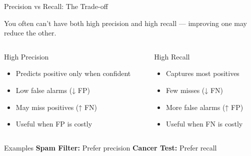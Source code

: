 \documentclass[usenames,dvipsnames]{beamer}
\begin{document}
\begin{frame}{Precision vs Recall: The Trade-off}


You often can't have both high precision and high recall — improving one may reduce the other.


\begin{columns}[t]
\begin{column}{0.48\textwidth}
	\begin{definitionbox}{High Precision}
	\begin{itemize}
		\item Predicts positive only when confident
		\item Low false alarms (↓ FP)
		\item May miss positives (↑ FN)
		\item Useful when FP is costly
	\end{itemize}
	\end{definitionbox}
\end{column}

\begin{column}{0.48\textwidth}
	\begin{definitionbox}{High Recall}
	\begin{itemize}
		\item Captures most positives
		\item Few misses (↓ FN)
		\item More false alarms (↑ FP)
		\item Useful when FN is costly
	\end{itemize}
	\end{definitionbox}
\end{column}
\end{columns}

\vspace{0.2cm}
\begin{examplebox}{Examples}
\textbf{Spam Filter:} Prefer precision \hfill \textbf{Cancer Test:} Prefer recall
\end{examplebox}

\end{frame}
\end{document}
